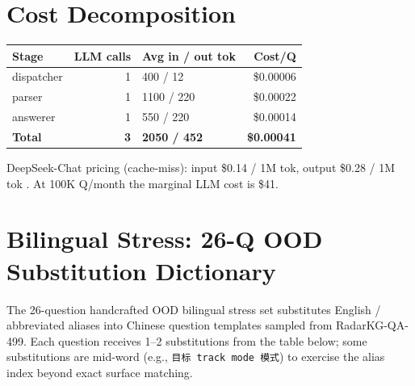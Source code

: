 \documentclass[review]{elsarticle}
\begin{document}
\section{Cost Decomposition}
\label{app:cost}

\begin{table}[h]
\centering
\small
\begin{tabular}{l r l r}
\toprule
\textbf{Stage} & \textbf{LLM calls} & \textbf{Avg in / out tok} & \textbf{Cost/Q} \\
\midrule
dispatcher & 1 & 400 / 12   & \$0.00006 \\
parser     & 1 & 1100 / 220 & \$0.00022 \\
answerer   & 1 & 550 / 220  & \$0.00014 \\
\midrule
\textbf{Total} & \textbf{3} & \textbf{2050 / 452} & \textbf{\$0.00041} \\
\bottomrule
\end{tabular}
\end{table}

DeepSeek-Chat pricing (cache-miss): input \$0.14 / 1M tok, output \$0.28 / 1M tok \citep{deepseek_api}. At 100K Q/month the marginal LLM cost is \$41.

\section{Bilingual Stress: 26-Q OOD Substitution Dictionary}
\label{app:bilingual}

The 26-question handcrafted OOD bilingual stress set substitutes English / abbreviated aliases into Chinese question templates sampled from RadarKG-QA-499. Each question receives 1--2 substitutions from the table below; some substitutions are mid-word (e.g., \texttt{目标 track mode 模式}) to exercise the alias index beyond exact surface matching.
\end{document}
